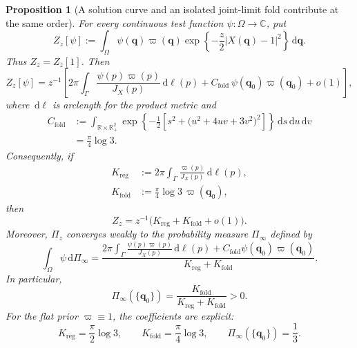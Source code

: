 \documentclass[11pt]{amsart}
\numberwithin{equation}{section}
\newtheorem{proposition}[theorem]{Proposition}
\theoremstyle{definition}
\theoremstyle{remark}
\newcommand{\R}{\mathbb{R}}
\newcommand{\C}{\mathbb{C}}
\newcommand{\dd}{\,\mathrm{d}}
\begin{document}
\begin{proposition}[A solution curve and an isolated joint-limit fold contribute
at the same order]\label{prop:robot-posterior-splitting}
For every continuous test function $\psi:\Omega\to\C$, put
\[
 Z_z[\psi]:=\int_\Omega
 \psi(\bm q)\varpi(\bm q)
 \exp\left\{-\frac z2|X(\bm q)-1|^2\right\}\dd \bm q.
\]
Thus $Z_z=Z_z[1]$.  Then
\begin{equation}\label{eq:robot-test-asymptotic}
 Z_z[\psi]=z^{-1}\left[
 2\pi\int_\Gamma
 \frac{\psi(p)\varpi(p)}{J_X(p)}\dd\ell(p)
 +C_{\mathrm{fold}}\,\psi(\bm q_0)\varpi(\bm q_0)
 +o(1)\right],
\end{equation}
where $\dd\ell$ is arclength for the product metric and
\begin{equation}\label{eq:robot-fold-constant}
 \begin{split}
 C_{\mathrm{fold}}
 &:=\int_{\R\times\R_+^2}
 \exp\left\{-\frac12\left[
 s^2+\bigl(u^2+4uv+3v^2\bigr)^2
 \right]\right\}\dd s\dd u\dd v\\
 &=\frac{\pi}{4}\log 3.
 \end{split}
\end{equation}
Consequently, if
\begin{align}
 K_{\mathrm{reg}}
 &:=2\pi\int_\Gamma
 \frac{\varpi(p)}{J_X(p)}\dd\ell(p),
 \label{eq:robot-Kreg}\\
 K_{\mathrm{fold}}
 &:=\frac{\pi}{4}\log 3\,\varpi(\bm q_0),
 \label{eq:robot-Kfold}
\end{align}
then
\begin{equation}\label{eq:robot-evidence}
 Z_z=z^{-1}\bigl(K_{\mathrm{reg}}+K_{\mathrm{fold}}+o(1)\bigr).
\end{equation}
Moreover, $\Pi_z$ converges weakly to the probability measure $\Pi_\infty$
defined by
\begin{equation}\label{eq:robot-weak-limit}
 \int_\Omega\psi\dd\Pi_\infty
 =\frac{
 \displaystyle
 2\pi\int_\Gamma
 \frac{\psi(p)\varpi(p)}{J_X(p)}\dd\ell(p)
 +C_{\mathrm{fold}}\psi(\bm q_0)\varpi(\bm q_0)}
 {K_{\mathrm{reg}}+K_{\mathrm{fold}}}.
\end{equation}
In particular,
\begin{equation}\label{eq:robot-atom-mass}
 \Pi_\infty(\{\bm q_0\})
 =\frac{K_{\mathrm{fold}}}
 {K_{\mathrm{reg}}+K_{\mathrm{fold}}}>0.
\end{equation}
For the flat prior $\varpi\equiv1$, the coefficients are explicit:
\begin{equation}\label{eq:robot-flat-prior-coefficients}
 K_{\mathrm{reg}}=\frac{\pi}{2}\log3,
 \qquad
 K_{\mathrm{fold}}=\frac{\pi}{4}\log3,
 \qquad
 \Pi_\infty(\{\bm q_0\})=\frac13.
\end{equation}
\end{proposition}
\end{document}
